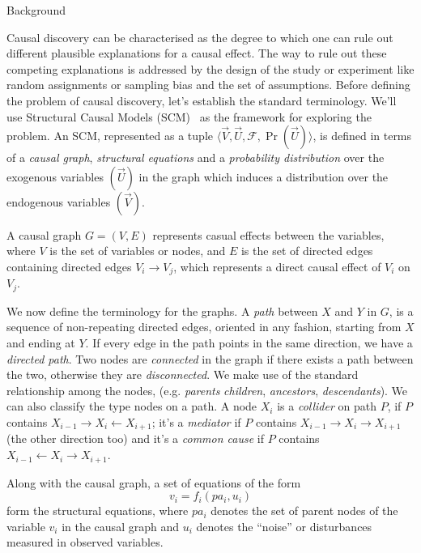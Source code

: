 \documentclass[10pt]{article}
\begin{document}
\begin{psection}[2]{Background}

    Causal discovery can be characterised as the degree to which one can rule out
    different plausible explanations for a causal effect. The way to rule out these
    competing explanations is addressed by the design of the study or experiment like
    random assignments or sampling bias and the set of assumptions. Before defining the
    problem of causal discovery, let's establish the standard terminology. We'll use
    Structural Causal Models (SCM)~\cite{pearl2000} as the framework for exploring the
    problem. An SCM, represented as a tuple $\langle \vec{V}, \vec{U}, \mathcal{F},
    \Pr{(\vec{U})} \rangle$, is defined in terms of a \textit{causal graph},
    \textit{structural equations} and a \textit{probability distribution} over the
    exogenous variables $(\vec{U})$ in the graph which induces a distribution over the
    endogenous variables $(\vec{V})$.

    \begin{definition}
        A causal graph $G = (V, E)$ represents casual effects between the variables,
        where $V$ is the set of variables or nodes, and $E$ is the set of directed edges
        containing directed edges $V_i \rightarrow V_j$, which represents a direct
        causal effect of $V_i$ on $V_j$. 
    \end{definition}

    We now define the terminology for the graphs. A \textit{path} between $X$ and $Y$ in
    $G$, is a sequence of non-repeating directed edges, oriented in any fashion,
    starting from $X$ and ending at $Y$. If every edge in the path points in the same
    direction, we have a \textit{directed path}. Two nodes are \textit{connected} in the
    graph if there exists a path between the two, otherwise they are
    \textit{disconnected}. We make use of the standard relationship among the nodes,
    (e.g. \textit{parents} \textit{children}, \textit{ancestors}, \textit{descendants}).
    We can also classify the type nodes on a path. A node $X_i$ is a \textit{collider}
    on path $P$, if $P$ contains $X_{i-1} \rightarrow X_i \leftarrow X_{i+1}$; it's a
    \textit{mediator} if $P$ contains $X_{i-1} \rightarrow X_i \rightarrow X_{i+1}$ (the
    other direction too) and it's a \textit{common cause} if $P$ contains $X_{i-1}
    \leftarrow X_{i} \rightarrow X_{i+1}$.   

    \begin{definition} 
        Along with the causal graph, a set of equations of the form 
        \begin{equation}
            v_i = f_i (pa_i, u_i)
        \end{equation}
        form the structural equations, where $pa_i$ denotes the set of parent nodes of
        the variable $v_i$ in the causal graph and $u_i$ denotes the ``noise'' or
        disturbances measured in observed variables. 
    \end{definition}


\end{psection}
\end{document}
